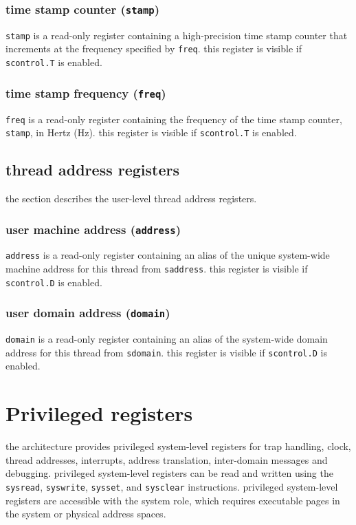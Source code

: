 \subsubsection{time stamp counter (\texttt{stamp})}
\texttt{stamp} is a read-only register containing a high-precision
time stamp counter that increments at the frequency specified by
\texttt{freq}.
this register is visible if \texttt{scontrol.T} is enabled.
\\

\subsubsection{time stamp frequency (\texttt{freq})}
\texttt{freq} is a read-only register containing the frequency of the
time stamp counter, \texttt{stamp}, in Hertz (Hz).
this register is visible if \texttt{scontrol.T} is enabled.
\\

\newpage
\subsection{thread address registers}
the section describes the user-level thread address registers.

\subsubsection{user machine address (\texttt{address})}
\texttt{address} is a read-only register containing an alias of the unique
system-wide machine address for this thread from \texttt{saddress}.
this register is visible if \texttt{scontrol.D} is enabled.
\\

\subsubsection{user domain address (\texttt{domain})}
\texttt{domain} is a read-only register containing an alias of the
system-wide domain address for this thread from \texttt{sdomain}.
this register is visible if \texttt{scontrol.D} is enabled.
\\

\newpage
\section{Privileged registers}
the architecture provides privileged system-level registers for
trap handling, clock, thread addresses, interrupts, address translation,
inter-domain messages and debugging.
\para
privileged system-level registers can be read and written
using the \texttt{sysread}, \texttt{syswrite}, \texttt{sysset}, and
\texttt{sysclear} instructions. privileged system-level registers are
accessible with the system role, which requires executable pages in
the system or physical address spaces.


